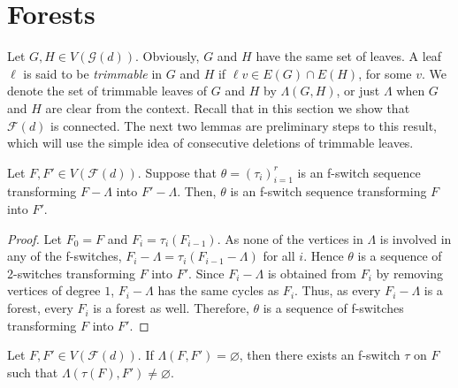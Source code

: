 \documentclass{BICA}
\begin{document}
\section{Forests}\label{sectionFTT}

Let \(G, H \in V(\mathcal{G}(d))\). Obviously, $G$ and $H$ have the same set of leaves. A leaf $\ell$ is said to be \emph{trimmable} in $G$ and $H$ if $\ell v\in E(G)\cap E(H)$, for some $v$. We denote the set of trimmable leaves of \(G\) and \(H\) by \(\Lambda(G,H)\), or just \(\Lambda\) when \(G\) and \(H\) are clear from the context. Recall that in this section we show that $\mathcal{F}(d)$ is connected. The next two lemmas are preliminary steps to this result, which will use the simple idea of consecutive deletions of trimmable leaves.

\begin{lemma}
	\label{tauiL}
	Let $F,F'\in V(\mathcal{F}(d))$. Suppose that $\theta=(\tau_{i})_{i=1}^{r}$ is an f-switch sequence transforming $F-\Lambda$ into $F'-\Lambda$. Then, $\theta$ is an f-switch sequence transforming $F$ into $F'$.
\end{lemma}
\begin{proof}
Let $F_0=F$ and $F_i=\tau_i(F_{i-1})$. As none of the vertices in $\Lambda$ is involved in any of the f-switches, $F_i-\Lambda=\tau_i(F_{i-1}-\Lambda)$ for all $i$. Hence $\theta$ is a sequence of 2-switches transforming $F$ into $F'$. Since $F_i-\Lambda$ is obtained from $F_i$ by removing vertices of degree $1$, $F_i-\Lambda$ has the same
cycles as $F_i$. Thus, as every $F_i-\Lambda$ is a forest, every $F_i$ is a forest as well. Therefore, $\theta$ is a sequence of f-switches transforming $F$ into $F'$.
\end{proof}

\begin{lemma}\label{ponerhojascompartidas}
	Let $F,F'\in V(\mathcal{F}(d))$. If \(\Lambda(F,F')=\varnothing\), then there exists an f-switch \(\tau\) on \(F\) such that  \(\Lambda(\tau(F),F')\neq \varnothing\).
\end{lemma}
\end{document}
